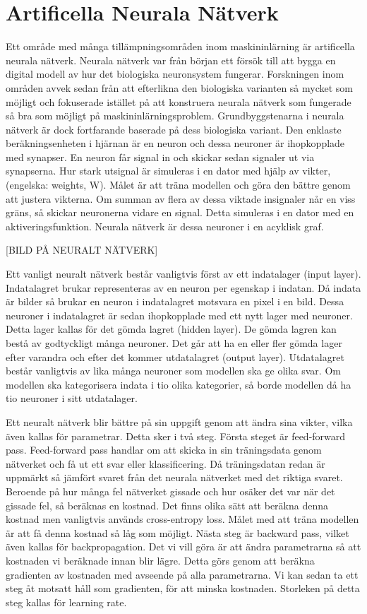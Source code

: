 \documentclass[]{kththesis}
\begin{document}
\section{Artificella Neurala Nätverk}
Ett område med många tillämpningsområden inom maskininlärning är artificella neurala nätverk. Neurala nätverk var från början ett försök till att bygga en digital modell av hur det biologiska neuronsystem fungerar. Forskningen inom områden avvek sedan från att efterlikna den biologiska varianten så mycket som möjligt och fokuserade istället på att konstruera neurala nätverk som fungerade så bra som möjligt på maskininlärningsproblem. Grundbyggstenarna i neurala nätverk är dock fortfarande baserade på dess biologiska variant. Den enklaste beräkningsenheten i hjärnan är en neuron och dessa neuroner är ihopkopplade med synapser. En neuron får signal in och skickar sedan signaler ut via synapserna. Hur stark utsignal är simuleras i en dator med hjälp av vikter, (engelska: weights, W). Målet är att träna modellen och göra den bättre genom att justera vikterna. Om summan av flera av dessa viktade insignaler når en viss gräns, så skickar neuronerna vidare en signal. Detta simuleras i en dator med en aktiveringsfunktion. Neurala nätverk är dessa neuroner i en acyklisk graf.

[BILD PÅ NEURALT NÄTVERK]

Ett vanligt neuralt nätverk består vanligtvis först av ett indatalager (input layer). Indatalagret brukar representeras av en neuron per egenskap i indatan. Då indata är bilder så brukar en neuron i indatalagret motsvara en pixel i en bild. Dessa neuroner i indatalagret är sedan ihopkopplade med ett nytt lager med neuroner. Detta lager kallas för det gömda lagret (hidden layer). De gömda lagren kan bestå av godtyckligt många neuroner. Det går att ha en eller fler gömda lager efter varandra och efter det kommer utdatalagret (output layer). Utdatalagret består vanligtvis av lika många neuroner som modellen ska ge olika svar. Om modellen ska kategorisera indata i tio olika kategorier, så borde modellen då ha tio neuroner i sitt utdatalager.

Ett neuralt nätverk blir bättre på sin uppgift genom att ändra sina vikter, vilka även kallas för parametrar. Detta sker i två steg. Första steget är feed-forward pass. Feed-forward pass handlar om att skicka in sin träningsdata genom nätverket och få ut ett svar eller klassificering. Då träningsdatan redan är uppmärkt så jämfört svaret från det neurala nätverket med det riktiga svaret. Beroende på hur många fel nätverket gissade och hur osäker det var när det gissade fel, så beräknas en kostnad. Det finns olika sätt att beräkna denna kostnad men vanligtvis används cross-entropy loss. Målet med att träna modellen är att få denna kostnad så låg som möjligt. Nästa steg är backward pass, vilket även kallas för backpropagation. Det vi vill göra är att ändra parametrarna så att kostnaden vi beräknade innan blir lägre. Detta görs genom att beräkna gradienten av kostnaden med avseende på alla parametrarna. Vi kan sedan ta ett steg åt motsatt håll som gradienten, för att minska kostnaden. Storleken på detta steg kallas för learning rate.
\end{document}
